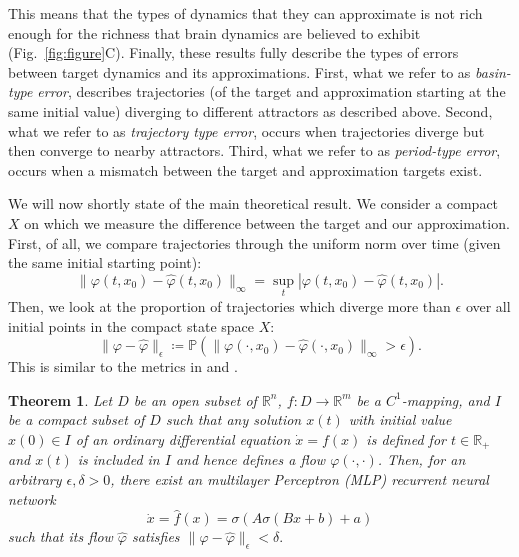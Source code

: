 \documentclass[10pt]{article}
\newtheorem{theorem}{Theorem}
\newcommand{\reals}{\mathbb{R}}
\begin{document}
    This means that the types of dynamics that they can approximate is not rich enough for the richness that brain dynamics are believed to exhibit (Fig.~\ref{fig:figure}C). 
Finally, these results fully describe the types of errors between target dynamics and its approximations.
  First, what we refer to as \emph{basin-type error}, describes trajectories (of the target and approximation starting at the same initial value) diverging to different attractors as described above.
  Second, what we refer to as \emph{trajectory type error}, occurs when trajectories diverge but then converge to nearby attractors. %
  Third, what we refer to as \emph{period-type error}, occurs when a mismatch between the target and approximation targets exist.
  
We will now shortly state of the main theoretical result.
We consider a compact $X$ on which we measure the difference between the target and our approximation.
First, of all, we compare trajectories through the uniform norm over time (given the same initial starting point):
\begin{equation}
\|\varphi(t,x_0)-\hat \varphi(t,x_0)\|_\infty = \sup_t|\varphi(t,x_0)-\hat \varphi(t,x_0)|.
\end{equation}
Then, we look at the proportion of trajectories which diverge more than $\epsilon$ over all initial points in the compact state space $X$:
\begin{equation}
\|\varphi-\hat \varphi\|_\epsilon \coloneqq  \mathbb{P}\left(\|\varphi(\cdot,x_0)-\hat \varphi(\cdot,x_0)\|_\infty>\epsilon\right).
\end{equation}
This is similar to the metrics in \citep{hammer2000approximation} and \citep{hanson2021learning}.
\begin{theorem}
Let $D$ be an open subset of $\mathbb{R}^n$, $f\colon D \to \mathbb{R}^m$ be a $C^1$-mapping, and $I$ be a compact subset of $D$ such that any solution $x(t)$ with initial value $x(0) \in I$ of an ordinary differential equation $\dot{x} = f(x)$ is defined for $t\in\reals_{+}$ and $x(t)$ is included in $I$ and hence defines a flow $\varphi(\cdot, \cdot)$.
 Then, for an arbitrary $\epsilon, \delta > 0$, there exist an multilayer Perceptron (MLP) recurrent neural network 
 \begin{equation}
\dot x = \hat f(x) = \sigma(A\sigma(Bx+b)+a)
\end{equation}
such that its flow $\hat \varphi$ satisfies $\|\varphi-\hat \varphi\|_\epsilon < \delta.$
\end{theorem}
\end{document}
